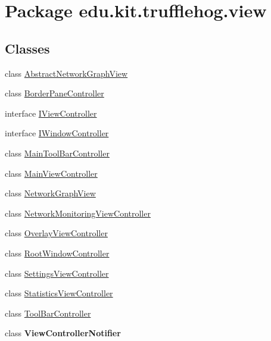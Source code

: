 \hypertarget{namespaceedu_1_1kit_1_1trufflehog_1_1view}{}\section{Package edu.\+kit.\+trufflehog.\+view}
\label{namespaceedu_1_1kit_1_1trufflehog_1_1view}
\subsection*{Classes}
\begin{DoxyCompactItemize}
\item 
class \hyperlink{classedu_1_1kit_1_1trufflehog_1_1view_1_1_abstract_network_graph_view}{Abstract\+Network\+Graph\+View}
\item 
class \hyperlink{classedu_1_1kit_1_1trufflehog_1_1view_1_1_border_pane_controller}{Border\+Pane\+Controller}
\item 
interface \hyperlink{interfaceedu_1_1kit_1_1trufflehog_1_1view_1_1_i_view_controller}{I\+View\+Controller}
\item 
interface \hyperlink{interfaceedu_1_1kit_1_1trufflehog_1_1view_1_1_i_window_controller}{I\+Window\+Controller}
\item 
class \hyperlink{classedu_1_1kit_1_1trufflehog_1_1view_1_1_main_tool_bar_controller}{Main\+Tool\+Bar\+Controller}
\item 
class \hyperlink{classedu_1_1kit_1_1trufflehog_1_1view_1_1_main_view_controller}{Main\+View\+Controller}
\item 
class \hyperlink{classedu_1_1kit_1_1trufflehog_1_1view_1_1_network_graph_view}{Network\+Graph\+View}
\item 
class \hyperlink{classedu_1_1kit_1_1trufflehog_1_1view_1_1_network_monitoring_view_controller}{Network\+Monitoring\+View\+Controller}
\item 
class \hyperlink{classedu_1_1kit_1_1trufflehog_1_1view_1_1_overlay_view_controller}{Overlay\+View\+Controller}
\item 
class \hyperlink{classedu_1_1kit_1_1trufflehog_1_1view_1_1_root_window_controller}{Root\+Window\+Controller}
\item 
class \hyperlink{classedu_1_1kit_1_1trufflehog_1_1view_1_1_settings_view_controller}{Settings\+View\+Controller}
\item 
class \hyperlink{classedu_1_1kit_1_1trufflehog_1_1view_1_1_statistics_view_controller}{Statistics\+View\+Controller}
\item 
class \hyperlink{classedu_1_1kit_1_1trufflehog_1_1view_1_1_tool_bar_controller}{Tool\+Bar\+Controller}
\item 
class {\bfseries View\+Controller\+Notifier}
\end{DoxyCompactItemize}


